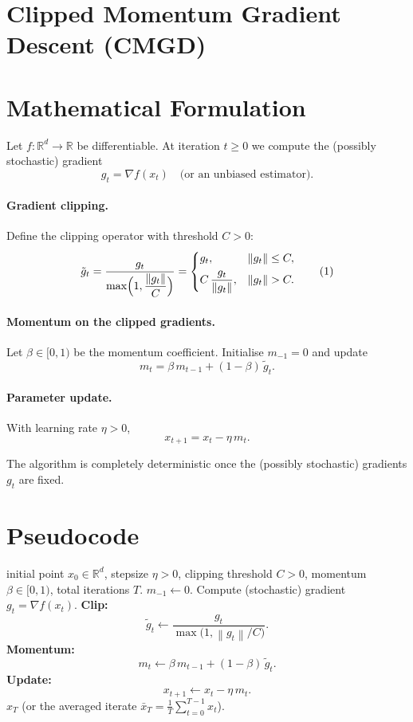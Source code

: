 \documentclass{article}
\newcommand{\norm}[1]{\left\|#1\right\|}
\newcommand{\R}{\mathbb{R}}
\begin{document}
\section*{Clipped Momentum Gradient Descent (CMGD)}

\section*{Mathematical Formulation}
Let $f:\R^{d}\rightarrow\R$ be differentiable.  
At iteration $t\ge 0$ we compute the (possibly stochastic) gradient
\[
g_{t}= \nabla f(x_{t})\quad\text{(or an unbiased estimator).}
\]

\paragraph{Gradient clipping.}
Define the clipping operator with threshold $C>0$:
\[
\tilde g_{t}= \frac{g_{t}}{\displaystyle \max\Bigl(1,\frac{\norm{g_{t}}}{C}\Bigr)}
=
\begin{cases}
g_{t}, & \norm{g_{t}}\le C,\\[4pt]
C\,\dfrac{g_{t}}{\norm{g_{t}}}, & \norm{g_{t}}> C .
\end{cases}
\tag{1}
\]

\paragraph{Momentum on the clipped gradients.}
Let $\beta\in[0,1)$ be the momentum coefficient.  Initialise $m_{-1}=0$ and update
\[
m_{t}= \beta\,m_{t-1}+(1-\beta)\,\tilde g_{t}. \tag{2}
\]

\paragraph{Parameter update.}
With learning rate $\eta>0$,
\[
x_{t+1}= x_{t}-\eta\, m_{t}. \tag{3}
\]

The algorithm is completely deterministic once the (possibly stochastic) gradients $g_{t}$ are fixed.

\section*{Pseudocode}
\begin{algorithm}[H]
\caption{Clipped Momentum Gradient Descent (CMGD)}
\begin{algorithmic}[1]
\REQUIRE initial point $x_{0}\in\R^{d}$, stepsize $\eta>0$, clipping threshold $C>0$, momentum $\beta\in[0,1)$, total iterations $T$.
\STATE $m_{-1}\gets 0$.
    \STATE Compute (stochastic) gradient $g_{t}= \nabla f(x_{t})$.
    \STATE \textbf{Clip:}
    \[
    \tilde g_{t}\gets 
    \frac{g_{t}}{\max\bigl(1,\norm{g_{t}}/C\bigr)}.
    \]
    \STATE \textbf{Momentum:}
    \[
    m_{t}\gets \beta\,m_{t-1}+(1-\beta)\,\tilde g_{t}.
    \]
    \STATE \textbf{Update:}
    \[
    x_{t+1}\gets x_{t}-\eta\,m_{t}.
    \]
\ENDFOR
\RETURN $x_{T}$ (or the averaged iterate $\bar x_{T}= \frac1T\sum_{t=0}^{T-1}x_{t}$).
\end{algorithmic}
\end{algorithm}
\end{document}
